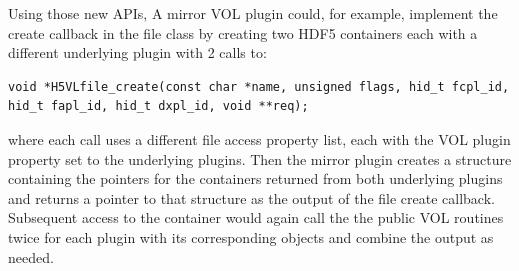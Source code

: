 Using those new APIs, A mirror VOL plugin could, for example, implement the create callback in the file class by creating two HDF5 containers each with a different underlying plugin with 2 calls to:
\begin{lstlisting}
void *H5VLfile_create(const char *name, unsigned flags, hid_t fcpl_id, hid_t fapl_id, hid_t dxpl_id, void **req);
\end{lstlisting}
where each call uses a different file access property list, each with the VOL plugin property set to the underlying plugins. Then the mirror plugin creates a structure containing the pointers for the containers returned from both underlying plugins and returns a pointer to that structure as the output of the file create callback. Subsequent access to the container would again call the the public VOL routines twice for each plugin with its corresponding objects and combine the output as needed. 


